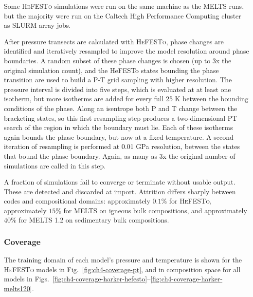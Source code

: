 Some \textsc{HeFESTo} simulations were run on the same machine as the MELTS runs, but the majority were run on the Caltech High Performance Computing cluster 
as SLURM array jobs.

After pressure transects are calculated with \textsc{HeFESTo}, phase changes are identified and iteratively resampled to 
improve the model resolution around phase boundaries. A random subset of these phase changes is chosen (up to 3x the
original simulation count), and the HeFESTo states
bounding the phase transition are used to build a P-T grid sampling with higher resolution. 
The pressure interval is divided into five steps, which is evaluated at at least one isotherm, but more isotherms are added 
for every full 25 K between the bounding conditions of the phase. Along an isentrope both P and T change between the bracketing states, so this first
resampling step produces a two-dimensional PT search of the region in which the boundary must lie. Each of these isotherms again bounds the phase boundary, 
but now at a fixed temperature. A second iteration of resampling is performed at 0.01 GPa resolution, between the states that
bound the phase boundary. Again, as many as 3x the original number of simulations are called in this step.

A fraction of simulations fail to converge or terminate without usable output. These
are detected and discarded at import. Attrition differs sharply between codes and
compositional domains: approximately $0.1\%$ for
\textsc{HeFESTo}, approximately $15\%$ for \textsc{MELTS} on igneous bulk
compositions, and approximately $40\%$ for \textsc{MELTS} 1.2 on sedimentary bulk
compositions.




\subsubsection{Coverage}

The training domain of each model's pressure and temperature is shown for the \textsc{HeFESTo} models in Fig.~\ref{fig:ch4-coverage-pt}, and in composition
space for all models in Figs.~\ref{fig:ch4-coverage-harker-hefesto}--\ref{fig:ch4-coverage-harker-melts120}.

